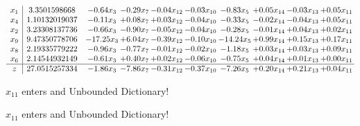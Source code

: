 \documentclass[9pt]{article}
\begin{document}
 \[\begin{array}{c| c c@{\hskip 2pt} c@{\hskip 2pt} c@{\hskip 2pt} c@{\hskip 2pt} c@{\hskip 2pt} c@{\hskip 2pt} c@{\hskip 2pt} c@{\hskip 2pt} }
 x_{1}   &  3.3501598668 & -0.64 x_{3} & -0.29 x_{7} & -0.04 x_{12} & -0.03 x_{10} & -0.83 x_{5} & +  0.05 x_{14} & -0.03 x_{13} & +  0.05 x_{11}\\
 x_{4}   &  1.10132019037 & -0.11 x_{3} & +  0.08 x_{7} & +  0.03 x_{12} & -0.04 x_{10} & -0.33 x_{5} & -0.02 x_{14} & -0.04 x_{13} & +  0.05 x_{11}\\
 x_{2}   &  3.23308137736 & -0.66 x_{3} & -0.90 x_{7} & -0.05 x_{12} & -0.04 x_{10} & -0.28 x_{5} & -0.01 x_{14} & +  0.04 x_{13} & +  0.02 x_{11}\\
 x_{9}   &  9.47350778706 & -17.25 x_{3} & +  6.04 x_{7} & -0.39 x_{12} & -0.10 x_{10} & -14.24 x_{5} & +  0.99 x_{14} & +  0.15 x_{13} & +  0.17 x_{11}\\
 x_{8}   &  2.19335779222 & -0.96 x_{3} & -0.77 x_{7} & -0.01 x_{12} & -0.02 x_{10} & -1.18 x_{5} & +  0.03 x_{14} & +  0.03 x_{13} & +  0.09 x_{11}\\
 x_{6}   &  2.14544932149 & -0.61 x_{3} & +  0.40 x_{7} & +  0.02 x_{12} & -0.06 x_{10} & -0.75 x_{5} & +  0.04 x_{14} & +  0.01 x_{13} & +  0.00 x_{11}\\
\hline
z    &  27.0515257334 & -1.86 x_{3} & -7.86 x_{7} & -0.31 x_{12} & -0.37 x_{10} & -7.26 x_{5} & +  0.20 x_{14} & +  0.21 x_{13} & +  0.04 x_{11}\\
\end{array}\]


 $ x_{11} $ enters and Unbounded Dictionary!


 $ x_{11} $ enters and Unbounded Dictionary!
\end{document}
